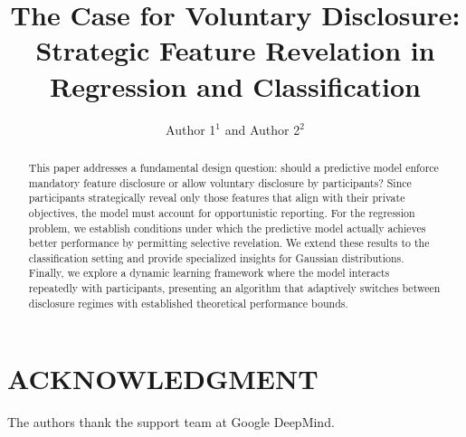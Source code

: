 \documentclass[letterpaper, 11pt]{article} %
\title{The Case for Voluntary Disclosure: Strategic Feature Revelation in Regression and Classification}
\author{Author 1$^{1}$ and Author 2$^{2}$}
\date{}
\begin{document}
\maketitle
\pagestyle{plain}

\begin{abstract}
This paper addresses a fundamental design question: should a predictive model enforce mandatory feature disclosure or allow voluntary disclosure by participants? Since participants strategically reveal only those features that align with their private objectives, the model must account for opportunistic reporting. For the regression problem, we establish conditions under which the predictive model actually achieves better performance by permitting selective revelation. We extend these results to the classification setting and provide specialized insights for Gaussian distributions. Finally, we explore a dynamic learning framework where the model interacts repeatedly with participants, presenting an algorithm that adaptively switches between disclosure regimes with established theoretical performance bounds.
\end{abstract}












\section*{ACKNOWLEDGMENT}
The authors thank the support team at Google DeepMind.




\end{document}
